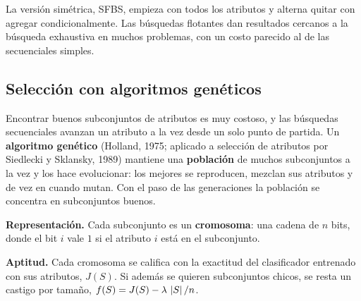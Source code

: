 \documentclass[11pt,letterpaper]{article}
\begin{document}
La versión simétrica, SFBS, empieza con todos los atributos y alterna
quitar con agregar condicionalmente. Las búsquedas flotantes dan
resultados cercanos a la búsqueda exhaustiva en muchos problemas, con
un costo parecido al de las secuenciales simples.


\subsection*{Selección con algoritmos genéticos}

Encontrar buenos subconjuntos de atributos es muy costoso, y las
búsquedas secuenciales avanzan un atributo a la vez desde un solo punto
de partida. Un \textbf{algoritmo genético} (Holland, 1975; aplicado a
selección de atributos por Siedlecki y Sklansky, 1989) mantiene una
\textbf{población} de muchos subconjuntos a la vez y los hace
evolucionar: los mejores se reproducen, mezclan sus atributos y de vez
en cuando mutan. Con el paso de las generaciones la población se
concentra en subconjuntos buenos.

\textbf{Representación.} Cada subconjunto es un
\textbf{cromosoma}: una cadena de $n$ bits, donde el bit $i$ vale $1$
si el atributo $i$ está en el subconjunto.

\begin{center}
\end{center}

\textbf{Aptitud.} Cada cromosoma se califica con la exactitud del
clasificador entrenado con sus atributos, $J(S)$. Si además se quieren
subconjuntos chicos, se resta un castigo por tamaño,
$f(S) = J(S) - \lambda\,\left\lvert S \right\rvert/n$.
\end{document}
